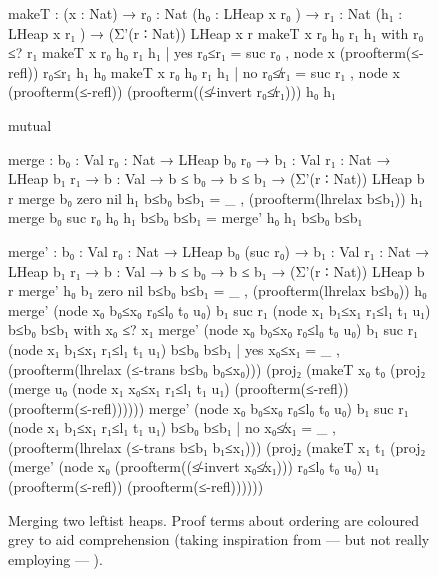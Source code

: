 \begin{sidewaysfigure}
\codefigure\small
\begin{code}
makeT : (x : Nat) →  {r₀  : Nat} (h₀  : LHeap x r₀  ) →
                     {r₁  : Nat} (h₁  : LHeap x r₁  ) → (Σ'(r ∶ Nat)) LHeap x r
makeT x {r₀} h₀ {r₁} h₁ with r₀ ≤? r₁
makeT x {r₀} h₀ {r₁} h₁ | yes  r₀≤r₁  = suc r₀  , node x (proofterm(≤-refl))  r₀≤r₁                          h₁  h₀
makeT x {r₀} h₀ {r₁} h₁ | no   r₀≰r₁  = suc r₁  , node x (proofterm(≤-refl))  (proofterm((≰-invert r₀≰r₁)))  h₀  h₁

mutual

  merge :  {b₀  : Val} {r₀  : Nat} → LHeap b₀  r₀  →
           {b₁  : Val} {r₁  : Nat} → LHeap b₁  r₁  →
           {b   : Val} → b ≤ b₀ → b ≤ b₁ → (Σ'(r ∶ Nat)) LHeap b r
  merge {b₀} {zero    } nil  h₁ b≤b₀ b≤b₁ = _ , (proofterm(lhrelax b≤b₁)) h₁
  merge {b₀} {suc r₀  } h₀   h₁ b≤b₀ b≤b₁ = merge' h₀ h₁ b≤b₀ b≤b₁

  merge' :  {b₀  : Val} {r₀   : Nat} → LHeap b₀  (suc r₀)  →
            {b₁  : Val} {r₁   : Nat} → LHeap b₁  r₁        →
            {b   : Val} → b ≤ b₀ → b ≤ b₁ → (Σ'(r ∶ Nat)) LHeap b r
  merge'  h₀                           {b₁} {zero     } nil                          b≤b₀ b≤b₁ = _ , (proofterm(lhrelax b≤b₀)) h₀
  merge'  (node x₀ b₀≤x₀ r₀≤l₀ t₀ u₀)  {b₁} {suc r₁   } (node x₁ b₁≤x₁ r₁≤l₁ t₁ u₁)  b≤b₀ b≤b₁  with x₀ ≤? x₁
  merge'  (node x₀ b₀≤x₀ r₀≤l₀ t₀ u₀)  {b₁} {suc r₁   } (node x₁ b₁≤x₁ r₁≤l₁ t₁ u₁)  b≤b₀ b≤b₁  | yes  x₀≤x₁ =
    _ , (proofterm(lhrelax (≤-trans b≤b₀ b₀≤x₀))) (proj₂ (makeT x₀ t₀ (proj₂ (merge u₀ (node x₁ x₀≤x₁ r₁≤l₁ t₁ u₁) (proofterm(≤-refl)) (proofterm(≤-refl))))))
  merge'  (node x₀ b₀≤x₀ r₀≤l₀ t₀ u₀)  {b₁} {suc r₁   } (node x₁ b₁≤x₁ r₁≤l₁ t₁ u₁)  b≤b₀ b≤b₁  | no   x₀≰x₁ =
    _ , (proofterm(lhrelax (≤-trans b≤b₁ b₁≤x₁))) (proj₂ (makeT x₁ t₁ (proj₂ (merge'  (node x₀ (proofterm((≰-invert x₀≰x₁))) r₀≤l₀ t₀ u₀) u₁ (proofterm(≤-refl)) (proofterm(≤-refl))))))
\end{code}
\caption{Merging two leftist heaps. Proof terms about ordering are coloured grey to aid comprehension (taking inspiration from --- but not really employing --- ).}
\label{fig:merge}
\end{sidewaysfigure}

